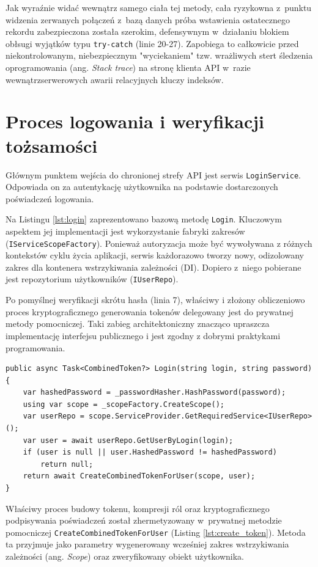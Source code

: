 \documentclass{SGGW-thesis}
\begin{document}
Jak wyraźnie widać wewnątrz samego ciała tej metody, cała ryzykowna z~punktu widzenia zerwanych połączeń z~bazą danych próba wstawienia ostatecznego rekordu zabezpieczona została szerokim, defensywnym w~działaniu blokiem obłsugi wyjątków typu \texttt{try-catch} (linie 20-27). Zapobiega to całkowicie przed niekontrolowanym, niebezpiecznym "wyciekaniem" tzw. wrażliwych stert śledzenia oprogramowania (ang. \textit{Stack trace}) na stronę klienta API w~razie wewnątrzserwerowych awarii relacyjnych kluczy indeksów.

\section{Proces logowania i weryfikacji tożsamości}

Głównym punktem wejścia do chronionej strefy API jest serwis \texttt{LoginService}. Odpowiada on za autentykację użytkownika na podstawie dostarczonych poświadczeń logowania. 

Na Listingu \ref{lst:login} zaprezentowano bazową metodę \texttt{Login}. Kluczowym aspektem jej implementacji jest wykorzystanie fabryki zakresów (\texttt{IServiceScopeFactory}). Ponieważ autoryzacja może być wywoływana z różnych kontekstów cyklu życia aplikacji, serwis każdorazowo tworzy nowy, odizolowany zakres dla kontenera wstrzykiwania zależności (DI). Dopiero z~niego pobierane jest repozytorium użytkowników (\texttt{IUserRepo}). 

Po pomyślnej weryfikacji skrótu hasła (linia 7), właściwy i złożony obliczeniowo proces kryptograficznego generowania tokenów delegowany jest do prywatnej metody pomocniczej. Taki zabieg architektoniczny znacząco upraszcza implementację interfejsu publicznego i jest zgodny z dobrymi praktykami programowania.

\begin{lstlisting}[caption={Metoda podstawowa autentykacji i weryfikacji hasła}, label={lst:login}]    
public async Task<CombinedToken?> Login(string login, string password)
{
    var hashedPassword = _passwordHasher.HashPassword(password);
    using var scope = _scopeFactory.CreateScope();
    var userRepo = scope.ServiceProvider.GetRequiredService<IUserRepo>();
    var user = await userRepo.GetUserByLogin(login);
    if (user is null || user.HashedPassword != hashedPassword)
        return null;
    return await CreateCombinedTokenForUser(scope, user);
}
\end{lstlisting}

Właściwy proces budowy tokenu, kompresji ról oraz kryptograficznego podpisywania poświadczeń został zhermetyzowany w~prywatnej metodzie pomocniczej \linebreak\texttt{CreateCombinedTokenForUser} (Listing \ref{lst:create_token}). Metoda ta przyjmuje jako parametry wygenerowany wcześniej zakres wstrzykiwania zależności (ang. \textit{Scope}) oraz zweryfikowany obiekt użytkownika. 
\end{document}
